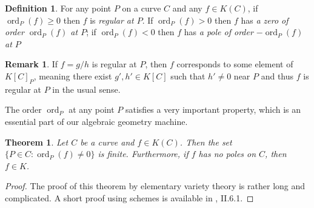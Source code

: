 \documentclass[12pt]{article}
\newtheorem{theorem}{Theorem}[subsection]
\theoremstyle{remark}
\theoremstyle{definition}
\newtheorem{remark}{Remark}[subsection]
\newtheorem{definition}{Definition}[subsection]
\newcommand{\ord}[0]{\operatorname{ord}}
\begin{document}
            \begin{definition}
                For any point $P$ on a curve $C$ and any $f\in K(C)$, if $\ord_P(f)\geqslant 0$ then $f$ is \textit{regular at $P$}. If $\ord_P(f)>0$ then $f$ has \textit{a zero of order $\ord_P(f)$ at $P$}; if $\ord_P(f)<0$ then $f$ has \textit{a pole of order $-\ord_P(f)$ at $P$}
            \end{definition}
            \begin{remark}
                If $f=g/h$ is regular at $P$, then $f$ corresponds to some element of $K[C]_P$, meaning there exist $g',h'\in K[C]$ such that $h'\neq 0$ near $P$ and thus $f$ is regular at $P$ in the usual sense.
            \end{remark}
            The order $\ord_P$ at any point $P$ satisfies a very important property, which is an essential part of our algebraic geometry machine.
            \begin{theorem}\label{theorem-fin-ord}
                Let $C$ be a curve and $f\in K(C)$. Then the set $\{P\in C:\ord_P(f)\neq 0\}$ is finite. Furthermore, if $f$ has no poles on $C$, then $f\in K$.
            \end{theorem}
            \begin{proof}
                The proof of this theorem by elementary variety theory is rather long and complicated. A short proof using schemes is available in \cite{hartshorne_2010_algebraic}, II.6.1.
            \end{proof}
            
            
            
\end{document}
